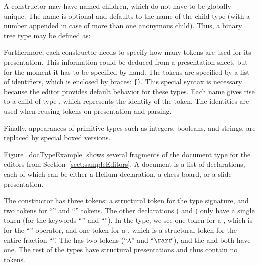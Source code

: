 \finalshortpage
A constructor may have named children, which do not have to be globally unique. The name is optional and defaults to the name of the child type (with a number appended in case of more than one anonymous child). Thus, a binary tree type may be defined as:


Furthermore, each constructor needs to specify how many tokens are used for its presentation. This information could be deduced from a presentation sheet, but for the moment it has to be specified by hand.  The tokens are specified by a list of identifiers, which is enclosed by braces: 
\verb|{|\verb|}|. This special syntax is necessary because the editor provides default behavior for these types.  Each name gives rise to a child of type , which represents the identity of the token. The identities are used when reusing tokens on presentation and parsing. 





\bc Finally, appearances of primitive types such as integers, booleans, and strings, are replaced by special boxed versions. 
\ec

Figure~\ref{docTypeExample} shows several fragments of the document type for the editors from Section~\ref{sect:sampleEditors}. A document is a list of declarations, each of which can be either a Helium declaration, a chess board, or a slide presentation.

The  constructor has three tokens: a structural token for the type signature, and two tokens for  ``\p{=}'' and ``\p{;}'' tokens. The other declarations ( and ) only have a single token (for the keywords ``'' and ``''). In the  type, we see one token for a , which is for the ``\p{+}'' operator, and one token for a , which is a structural token for the entire fraction ``''. The  has two tokens (``$\lambda$'' and ``$\rarr\!\!$''), and the  and  both have one.  The rest of the types have structural presentations and thus contain no tokens. 


